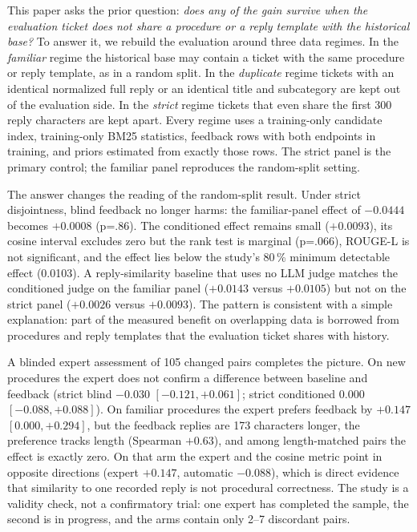 \documentclass{ieeeaccess}
\begin{document}
This paper asks the prior question: \emph{does any of the gain survive when the
evaluation ticket does not share a procedure or a reply template with the
historical base?} To answer it, we rebuild the evaluation around three data
regimes. In the \emph{familiar} regime the historical base may contain a ticket
with the same procedure or reply template, as in a random split. In the
\emph{duplicate} regime tickets with an identical normalized full reply or an
identical title and subcategory are kept out of the evaluation side. In the
\emph{strict} regime tickets that even share the first 300 reply characters are
kept apart. Every regime uses a training-only candidate index, training-only BM25
statistics, feedback rows with both endpoints in training, and priors estimated
from exactly those rows. The strict panel is the primary control; the familiar
panel reproduces the random-split setting.

The answer changes the reading of the random-split result. Under strict disjointness,
blind feedback no longer harms: the familiar-panel effect of $-0.0444$ becomes
$+0.0008$ (p=.86). The conditioned effect remains small ($+0.0093$), its cosine
interval excludes zero but the rank test is marginal (p=.066), ROUGE-L is not
significant, and the effect lies below the study's 80\,\% minimum detectable
effect (0.0103). A reply-similarity baseline that uses no LLM judge matches
the conditioned judge on the familiar panel ($+0.0143$ versus $+0.0105$) but not
on the strict panel ($+0.0026$ versus $+0.0093$). The pattern is consistent with a
simple explanation: part of the measured benefit on overlapping data is borrowed
from procedures and reply templates that the evaluation ticket shares with
history.

A blinded expert assessment of 105 changed pairs completes the picture. On new
procedures the expert does not confirm a difference between baseline and feedback (strict
blind $-0.030$ $[-0.121,+0.061]$; strict conditioned $0.000$
$[-0.088,+0.088]$). On familiar procedures the expert prefers feedback by $+0.147$
$[0.000,+0.294]$, but the feedback replies are 173 characters longer, the
preference tracks length (Spearman $+0.63$), and among length-matched pairs the
effect is exactly zero. On that arm the expert and the cosine metric point in
opposite directions (expert $+0.147$, automatic $-0.088$), which is direct
evidence that similarity to one recorded reply is not procedural correctness. The
study is a validity check, not a confirmatory trial: one expert has completed the
sample, the second is in progress, and the arms contain only 2--7 discordant pairs.
\end{document}
